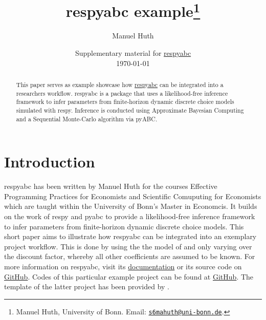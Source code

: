 \documentclass[11pt, a4paper, leqno]{article}
\begin{document}
\title{respyabc example\thanks{Manuel Huth, University of Bonn. Email: \href{mailto:s6mahuth@uni-bonn.de}{\nolinkurl{s6mahuth@uni-bonn.de}}.}}

\author{Manuel Huth}

\date{
    {Supplementary material for \href{https://respyabc.readthedocs.io/en/latest/index.html}{respyabc}}
    \\[1ex]
    \today
}

\maketitle


\begin{abstract}
This paper serves as example showcase how \href{https://respyabc.readthedocs.io/en/latest/index.html}{respyabc} can be integrated into a researchers workflow. respyabc is a package that uses a likelihood-free inference framework to infer parameters from finite-horizon dynamic discrete choice models simulated with respy. Inference is conducted using Approximate Bayesian Computing and a Sequential Monte-Carlo algorithm via pyABC.
\end{abstract}
\clearpage

\section{Introduction} %
\label{sec:introduction}
respyabc has been written by Manuel Huth for the courses Effective Programming Practices for Economists and Scientific Comuputing for Economists which are taught within the University of Bonn's Master in Economcis. It builds on the work of respy \citep{Gabler2020} and pyabc \citep{klinger2018} to provide a likelihood-free inference framework to infer parameters from finite-horizon dynamic discrete choice models. This short paper aims to illustrate how respyabc can be integrated into an exemplary project workflow. This is done by using the the model of \citet{keane1994} and only varying over the discount factor, whereby all other coefficients are assumed to be known. For more information on respyabc, visit its \href{https://respyabc.readthedocs.io/en/latest/index.html}{documentation} or its source code on \href{https://github.com/manuhuth/respyabc}{GitHub}. Codes of this particular example project can be found at \href{https://github.com/manuhuth/respyabc_application}{GitHub}. The template of the latter project has been provided by \citet{GaudeckerEconProjectTemplates}.
\end{document}
